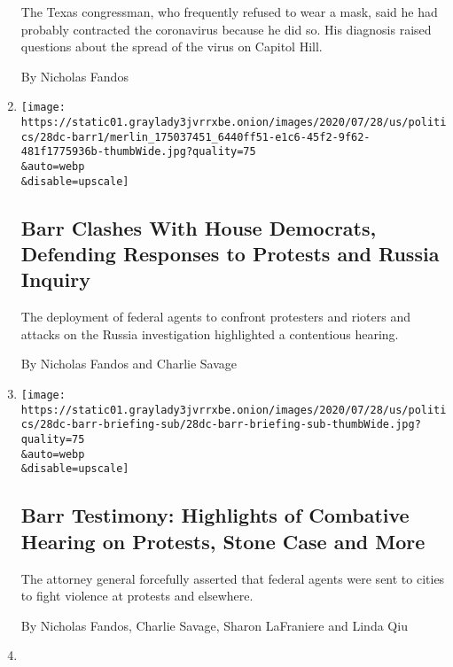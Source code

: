 \begin{enumerate}
  The Texas congressman, who frequently refused to wear a mask, said he
  had probably contracted the coronavirus because he did so. His
  diagnosis raised questions about the spread of the virus on Capitol
  Hill.

  By Nicholas Fandos
\item
  \href{/2020/07/28/us/politics/barr-testimony.html}{}

  \texttt{[image: https://static01.graylady3jvrrxbe.onion/images/2020/07/28/us/politics/28dc-barr1/merlin\_175037451\_6440ff51-e1c6-45f2-9f62-481f1775936b-thumbWide.jpg?quality=75\\\&auto=webp\\\&disable=upscale]}

  \hypertarget{barr-clashes-with-house-democrats-defending-responses-to-protests-and-russia-inquiry}{%
  \subsection{Barr Clashes With House Democrats, Defending Responses to
  Protests and Russia
  Inquiry}\label{barr-clashes-with-house-democrats-defending-responses-to-protests-and-russia-inquiry}}

  The deployment of federal agents to confront protesters and rioters
  and attacks on the Russia investigation highlighted a contentious
  hearing.

  By Nicholas Fandos and Charlie Savage
\item
  \href{/2020/07/28/us/politics/william-barr-house-judiciary-hearing.html}{}

  \texttt{[image: https://static01.graylady3jvrrxbe.onion/images/2020/07/28/us/politics/28dc-barr-briefing-sub/28dc-barr-briefing-sub-thumbWide.jpg?quality=75\\\&auto=webp\\\&disable=upscale]}

  \hypertarget{barr-testimony-highlights-of-combative-hearing-on-protests-stone-case-and-more}{%
  \subsection{Barr Testimony: Highlights of Combative Hearing on
  Protests, Stone Case and
  More}\label{barr-testimony-highlights-of-combative-hearing-on-protests-stone-case-and-more}}

  The attorney general forcefully asserted that federal agents were sent
  to cities to fight violence at protests and elsewhere.

  By Nicholas Fandos, Charlie Savage, Sharon LaFraniere and Linda Qiu
\item
  \href{/2020/07/27/us/politics/william-barr-house-judiciary-hearing.html}{}


\end{enumerate}
